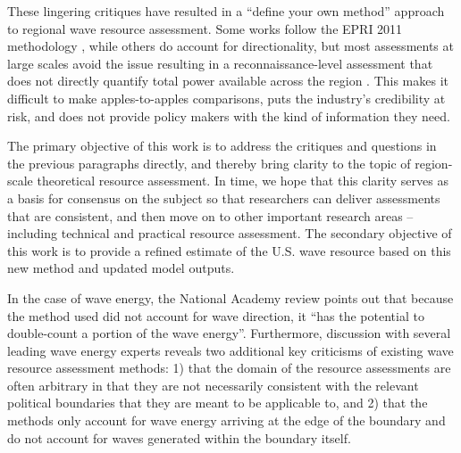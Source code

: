 These lingering critiques have resulted in a “define your own method” approach to regional wave resource assessment. Some works follow the EPRI 2011 methodology , while others do account for directionality, but most assessments at large scales avoid the issue resulting in a reconnaissance-level assessment that does not directly quantify total power available across the region . This makes it difficult to make apples-to-apples comparisons, puts the industry’s credibility at risk, and does not provide policy makers with the kind of information they need. 

The primary objective of this work is to address the critiques and questions in the previous paragraphs directly, and thereby bring clarity to the topic of region-scale theoretical resource assessment. In time, we hope that this clarity serves as a basis for consensus on the subject so that researchers can deliver assessments that are consistent, and then move on to other important research areas – including technical and practical resource assessment. The secondary objective of this work is to provide a refined estimate of the U.S. wave resource based on this new method and updated model outputs.

In the case of wave energy, the National Academy review points out that
because the method used did not account for wave direction, it ``has the
potential to double-count a portion of the wave energy''. Furthermore, discussion with several leading wave energy experts reveals two additional key criticisms of existing wave resource assessment methods: 1) that the domain of the resource assessments are often arbitrary in that they are not necessarily consistent with the relevant political boundaries that they are meant to be applicable to, and 2) that the methods only account for wave energy arriving at the edge of the boundary and do not account for waves generated within the boundary itself.

